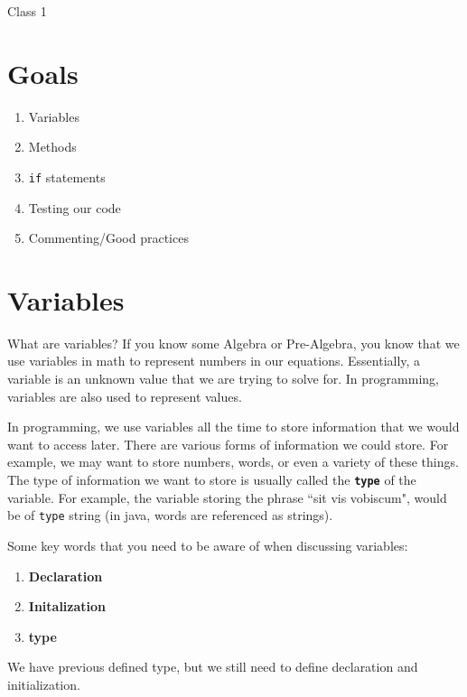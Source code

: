 \documentclass[11pt,fleqn]{article}
\begin{document}
\begin{center}
{\Huge
Class 1
}\\
\end{center}

\section*{Goals}
\begin{enumerate}[1.]
\item
Variables

\item
Methods

\item 
\texttt{if} statements

\item
Testing our code

\item
Commenting/Good practices
\end{enumerate}

\section*{Variables}
What are variables? If you know some Algebra or Pre-Algebra, you know that
we use variables in math to represent numbers in our equations. Essentially, a
variable is an unknown value that we are trying to solve for. In programming,
variables are also used to represent values. 

In programming, we use variables all the time to store information that we would
want to access later. There are various forms of information we could store. For
example, we may want to store numbers, words, or even a variety of these things.
The type of information we want to store is usually called the
\textbf{\texttt{type}} of the variable. For example, the variable storing the
phrase ``sit vis vobiscum", would be of \texttt{type} string (in java, words are
referenced as strings). 

Some key words that you need to be aware of when discussing variables:
\begin{enumerate}
\item
\textbf{Declaration}

\item
\textbf{Initalization}

\item
\textbf{type}
\end{enumerate}

We have previous defined type, but we still need to define declaration and
initialization. 
\end{document}
